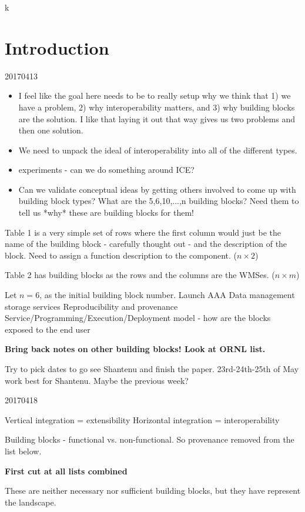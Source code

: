 k\section{Introduction}

20170413
\begin{itemize}
\item I feel like the goal here needs to be to really setup why we think that 1) we have a problem, 2) why interoperability matters, and 3) why building blocks are the solution. I like that laying it out that way gives us two problems and then one solution.
\item We need to unpack the ideal of interoperability into all of the different types.
\item experiments - can we do something around ICE?
\item Can we validate conceptual ideas by getting others involved to come up with building block types? What are the 5,6,10,...,n building blocks? Need them to tell us *why* these are building blocks for them!
\end{itemize}

Table 1 is a very simple set of rows where the first column would just be the name of the building block - carefully thought out - and the description of the block. Need to assign a function description to the component. ($n \times 2$)

Table 2 has building blocks as the rows and the columns are the WMSes. ($n \times m$)

Let $n = 6$, as the initial building block number.
Launch
AAA
Data management storage services
Reproducibility and provenance
Service/Programming/Execution/Deployment model - how are the blocks exposed to the end user

\textbf{Bring back notes on other building blocks! Look at ORNL list.}

Try to pick dates to go see Shantenu and finish the paper. 23rd-24th-25th of May work best for Shantenu. Maybe the previous week?

20170418

Vertical integration = extensibility
Horizontal integration = interoperability

Building blocks - functional vs. non-functional. So provenance removed from the list below.

{\bf First cut at all lists combined}

These are neither necessary nor sufficient building blocks, but they have represent the landscape.


